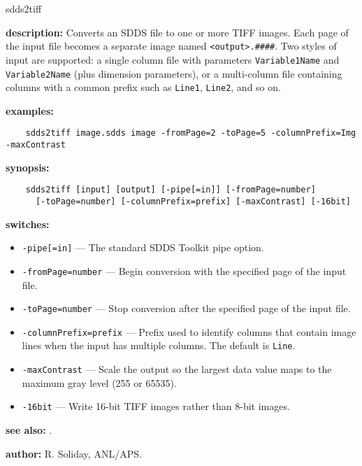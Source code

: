 \begin{sddsprog}{sdds2tiff}
  \item \textbf{description:} Converts an SDDS file to one or more TIFF images. Each page of the input file becomes a separate image named \verb|<output>.####|. Two styles of input are supported: a single column file with parameters \verb|Variable1Name| and \verb|Variable2Name| (plus dimension parameters), or a multi-column file containing columns with a common prefix such as \verb|Line1|, \verb|Line2|, and so on.
  \item \textbf{examples:}
    \begin{verbatim}
    sdds2tiff image.sdds image -fromPage=2 -toPage=5 -columnPrefix=Img -maxContrast
    \end{verbatim}
  \item \textbf{synopsis:}
    \begin{verbatim}
    sdds2tiff [input] [output] [-pipe[=in]] [-fromPage=number]
      [-toPage=number] [-columnPrefix=prefix] [-maxContrast] [-16bit]
    \end{verbatim}
  \item \textbf{switches:}
    \begin{itemize}
      \item \verb|-pipe[=in]| --- The standard SDDS Toolkit pipe option.
      \item \verb|-fromPage=number| --- Begin conversion with the specified page of the input file.
      \item \verb|-toPage=number| --- Stop conversion after the specified page of the input file.
      \item \verb|-columnPrefix=prefix| --- Prefix used to identify columns that contain image lines when the input has multiple columns. The default is \verb|Line|.
      \item \verb|-maxContrast| --- Scale the output so the largest data value maps to the maximum gray level (255 or 65535).
      \item \verb|-16bit| --- Write 16-bit TIFF images rather than 8-bit images.
    \end{itemize}
  \item \textbf{see also:} .
  \item \textbf{author:} R. Soliday, ANL/APS.
\end{sddsprog}


